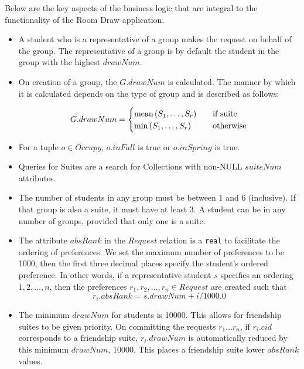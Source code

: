 \noindent Below are the key aspects of the business logic that are integral to
the functionality of the Room Draw application.

\begin{itemize}
\item A student who is a representative of a group makes the request on behalf
of the group. The representative of a group is by default the student in the
group with the highest \(drawNum\).

\item On creation of a group, the \(G.drawNum\) is calculated. The manner by
which it is calculated depends on the type of group and is described as follows:

\[
    G.drawNum =
        \begin{cases}
        \text{mean} \del{S_1, \ldots, S_r} & \quad \mbox{if suite} \\
        \min \del{S_1, \ldots, S_r} & \quad \mbox{otherwise}
        \end{cases}
\]

\item For a tuple \(o \in Occupy\), \(o.inFall\) is true or \(o.inSpring\) is true.

\item Queries for Suites are a search for Collections with non-NULL \(suiteNum\)
attributes.

\item The number of students in any group must be between 1 and 6 (inclusive).
If that group is also a suite, it must have at least 3. A student can be in any
number of groups, provided that only one is a suite.

\item The attribute \(absRank\) in the \(Request\) relation is a \texttt{real} to
facilitate the ordering of preferences.  We set the maximum number of preferences to
be 1000, then the first three decimal places specify the student's ordered
preference. In other words, if a representative student \(s\) specifies an
ordering \(1,2,\ldots, n\), then the preferences \(r_1,r_2, \ldots, r_n \in
Request\) are created such that \[r_i.absRank = s.drawNum + i/1000.0\]

\item The minimum \(drawNum\) for students is \num{10000}. This allows for
friendship suites to be given priority. On committing the requests \(r_1\ldots
r_n\), if \(r_i.cid\) corresponds to a friendship suite, \(r_i.drawNum\) is
automatically reduced by this minimum \(drawNum\), \num{10000}. This places a friendship suite lower \(absRank\) values.
\end{itemize}

